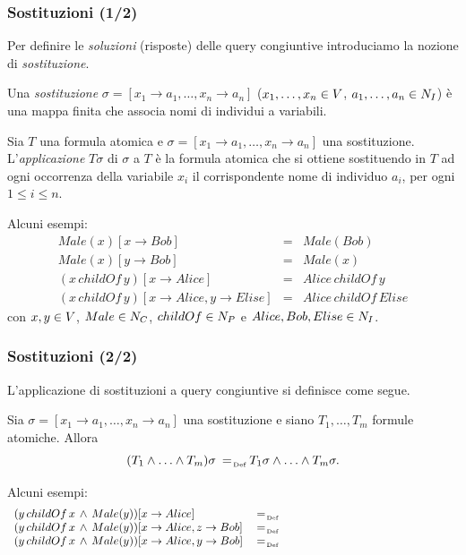 \documentclass[8pt]{beamer}
\begin{document}
\begin{frame}
\frametitle{Sostituzioni (1/2)}

Per definire le \emph{soluzioni} (risposte) delle query congiuntive introduciamo la
nozione di \emph{sostituzione}.
\vspace{\baselineskip}

Una \emph{sostituzione} $\sigma=[x_1 \rightarrow a_1, \ldots, x_n \rightarrow a_n]$
($x_1, \ldots, x_n \in V$, $a_1, \ldots, a_n \in N_I$)
\`e una mappa finita che associa nomi di individui a variabili.
\vspace{\baselineskip}

Sia $T$ una formula atomica e $\sigma=[x_1 \rightarrow a_1, \ldots, x_n \rightarrow a_n]$
una sostituzione. L'\emph{applicazione} $T\sigma$ di $\sigma$ a $T$ \`e la formula atomica
che si ottiene sostituendo in $T$ ad ogni occorrenza della variabile $x_i$ il
corrispondente nome di individuo $a_i$, per ogni $1\leq i\leq n$.
\vspace{\baselineskip}

Alcuni esempi:
\[
 \begin{array}{lcl}
  Male(x)[x \rightarrow Bob] & = & Male(Bob) \\
  Male(x)[y \rightarrow Bob] & = & Male(x) \\
  (x\,childOf\,y)[x \rightarrow Alice] & = & Alice\,childOf\,y \\
  (x\,childOf\,y)[x \rightarrow Alice, y \rightarrow Elise] & = & Alice\,childOf\,Elise
 \end{array}
\]
con $x,y \in V$, $Male \in N_C$, $childOf \in N_P$ e $Alice, Bob, Elise \in N_I$.
\end{frame}

\begin{frame}
\frametitle{Sostituzioni (2/2)}

L'applicazione di sostituzioni a query congiuntive si definisce come segue.
\vspace{\baselineskip}

Sia $\sigma=[x_1 \rightarrow a_1, \ldots, x_n \rightarrow a_n]$ una sostituzione
e siano $T_1, \ldots, T_m$ formule atomiche. Allora
\[
 (T_1 \wedge \ldots \wedge T_m)\sigma \defAs T_1\sigma \wedge \ldots \wedge T_m\sigma . 
\]
\vspace{\baselineskip}

Alcuni esempi:
\[
 \begin{array}{lcl}
 (y\,childOf\,x\,\wedge\,Male(y))[x \rightarrow Alice] & \defAs & \phantom{y\,childOf\,Alice\,\wedge\,Male(y)}  \\
 (y\,childOf\,x\,\wedge\,Male(y))[x \rightarrow Alice, z \rightarrow Bob] & \defAs & \phantom{y\,childOf\,Alice\,\wedge\,Male(y)}  \\
 (y\,childOf\,x\,\wedge\,Male(y))[x \rightarrow Alice, y \rightarrow Bob] & \defAs & \phantom{Bob\,childOf\,Alice\,\wedge\,Male(Bob)}  \\
 \end{array}
\]
\end{frame}
\end{document}
